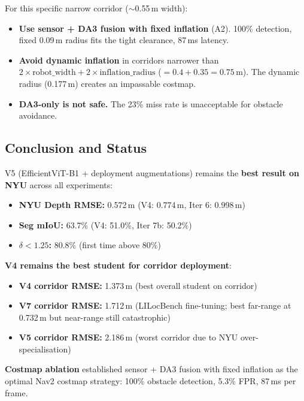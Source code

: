 \documentclass[11pt,a4paper]{article}
\begin{document}
For this specific narrow corridor ($\sim$0.55\,m width):
\begin{itemize}[nosep]
  \item \textbf{Use sensor + DA3 fusion with fixed inflation} (A2).
    100\% detection, fixed 0.09\,m radius fits the tight clearance,
    87\,ms latency.
  \item \textbf{Avoid dynamic inflation} in corridors narrower than
    $2 \times \text{robot\_width} + 2 \times \text{inflation\_radius}$
    ($= 0.4 + 0.35 = 0.75$\,m). The dynamic radius (0.177\,m) creates
    an impassable costmap.
  \item \textbf{DA3-only is not safe.} The 23\% miss rate is unacceptable
    for obstacle avoidance.
\end{itemize}

\subsection{Conclusion and Status}
\label{sec:vivek-conclusion}

V5 (EfficientViT-B1 + deployment augmentations) remains the \textbf{best result
on NYU} across all experiments:

\begin{itemize}[nosep]
  \item \textbf{NYU Depth RMSE:} 0.572\,m (V4: 0.774\,m, Iter 6: 0.998\,m)
  \item \textbf{Seg mIoU:} 63.7\% (V4: 51.0\%, Iter 7b: 50.2\%)
  \item \textbf{$\delta < 1.25$:} 80.8\% (first time above 80\%)
\end{itemize}

\textbf{V4 remains the best student for corridor deployment}:

\begin{itemize}[nosep]
  \item \textbf{V4 corridor RMSE:} 1.373\,m (best overall student on corridor)
  \item \textbf{V7 corridor RMSE:} 1.712\,m (LILocBench fine-tuning; best
    far-range at 0.732\,m but near-range still catastrophic)
  \item \textbf{V5 corridor RMSE:} 2.186\,m (worst corridor due to NYU over-specialisation)
\end{itemize}

\textbf{Costmap ablation} established sensor + DA3 fusion with fixed inflation
as the optimal Nav2 costmap strategy: 100\% obstacle detection, 5.3\% FPR,
87\,ms per frame.
\end{document}
